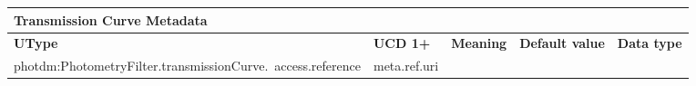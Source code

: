 \documentclass[11pt,a4paper]{ivoa}
\begin{document}
\begin{appendices}



\newpage


\begin{table}[H]
\centering
\begin{adjustbox}{angle=90}
\begin{tabular}{p{2.5in}|p{1.5in}|p{2in}|p{0.74in}|p{0.35in}}
\multicolumn{5}{p{\dimexpr6.59in+8\tabcolsep\relax}}{\centering
{\fontsize{10pt}{12.0pt}\selectfont \textbf{Transmission Curve Metadata}}} \\
\hline
\multicolumn{1}{p{2.5in}}{{\fontsize{8pt}{8pt}\selectfont \textbf{UType}}} &
\multicolumn{1}{p{1.5in}}{{\fontsize{8pt}{8pt}\selectfont \textbf{UCD 1+}}} &
\multicolumn{1}{p{2in}}{{\fontsize{8pt}{8pt}\selectfont \textbf{Meaning}}} &
\multicolumn{1}{p{0.74in}}{{\fontsize{8pt}{8pt}\selectfont \textbf{Default value}}} &
\multicolumn{1}{p{0.35in}}{{\fontsize{8pt}{8pt}\selectfont \textbf{Data type}}} \\
\hline
\multicolumn{1}{p{2.5in}}{{\fontsize{8pt}{8pt}
\selectfont photdm:PhotometryFilter.transmissionCurve.\ access.reference}} &
\multicolumn{1}{p{1.5in}}{{\fontsize{8pt}{8pt}\selectfont meta.ref.uri }} &


\end{tabular}
\end{adjustbox}
\end{table}
\end{appendices}
\end{document}

